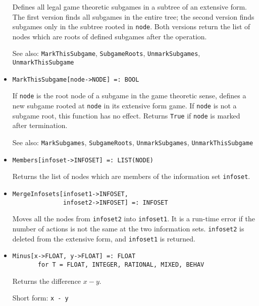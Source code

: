 \begin{itemize}
\bd
Defines all legal game theoretic subgames in a subtree of an extensive
form.  The first version finds all subgames in the entire tree; the
second version finds subgames only in the subtree rooted in \verb+node+.
Both versions return the list of nodes which are roots of defined
subgames after the operation.
\item
[See also:] {\tt MarkThisSubgame}, {\tt SubgameRoots}, {\tt UnmarkSubgames},
{\tt UnmarkThisSubgame}
\ed

\item
\protect \large \begin{verbatim}
MarkThisSubgame[node->NODE] =: BOOL
\end{verbatim}\normalsize

\bd
If \verb+node+ is the root node of a subgame in the game theoretic
sense, defines a new subgame rooted at \verb+node+ in its extensive
form game.  If \verb+node+ is not a subgame root, this function has
no effect.  Returns \verb+True+ if \verb+node+ is marked after termination.
\item
[See also:] {\tt MarkSubgames}, {\tt SubgameRoots}, {\tt UnmarkSubgames},
{\tt UnmarkThisSubgame}
\ed

\item
\protect \large \begin{verbatim}
Members[infoset->INFOSET] =: LIST(NODE)
\end{verbatim}\normalsize

\bd
Returns the list of nodes which are members of the information
set \verb+infoset+.
\ed

\item
\protect \large \begin{verbatim}
MergeInfosets[infoset1->INFOSET,
              infoset2->INFOSET] =: INFOSET
\end{verbatim}\normalsize

\bd
Moves all the nodes from \verb+infoset2+ into \verb+infoset1+.
It is a run-time error if the number of actions is not the same at the
two information sets.  \verb+infoset2+ is deleted from the extensive form,
and \verb+infoset1+ is returned.
\ed

\item 
\protect \large \begin{verbatim}
Minus[x->FLOAT, y->FLOAT] =: FLOAT
       for T = FLOAT, INTEGER, RATIONAL, MIXED, BEHAV
\end{verbatim} \normalsize

\bd
Returns the difference $x - y$.
\item
[Short form:] \verb+x - y+
\ed


\end{itemize}
